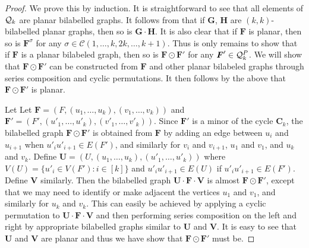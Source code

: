 \documentclass[11pt,a4paper]{article}
\theoremstyle{plain}
\theoremstyle{remark}
\theoremstyle{definition}
\newcommand{\cyclicpermutations}{\mathscr{C}(1,\dots, k, 2k, \dots, k+1)}
\begin{document}
\begin{proof}
    We prove this by induction. It is straightforward to see that all elements of ${\mathcal Q}_k$ are planar bilabelled graphs. It follows from \cite[Lemma 5.12]{david-laura} that if $\boldsymbol{G}$, $\boldsymbol{H}$ are $(k,k)$-bilabelled planar graphs, then so is $\boldsymbol{G} \cdot \boldsymbol{H}$. It is also clear that if $\boldsymbol{F}$ is planar, then so is $\boldsymbol{F}^\sigma$ for any $\sigma \in \cyclicpermutations$. Thus is only remains to show that if $\boldsymbol{F}$ is a planar bilabeled graph, then so is $\boldsymbol{F} \odot \boldsymbol{F}'$ for any $\boldsymbol{F}' \in {\mathcal Q}_k^P$. We will show that $\boldsymbol{F} \odot \boldsymbol{F}'$ can be constructed from $\boldsymbol{F}$ and other planar bilabeled graphs through series composition and cyclic permutations. It then follows by the above that $\boldsymbol{F} \odot \boldsymbol{F}'$ is planar.

    Let Let $\boldsymbol{F} = (F,(u_1,\ldots, u_k),(v_1,\ldots,v_k))$ and $\boldsymbol{F}' = (F',(u'_1,\ldots, u'_k),(v'_1,\ldots,v'_k))$. Since $\boldsymbol{F}'$ is a minor of the cycle $\boldsymbol{C}_k$, the bilabelled graph $\boldsymbol{F} \odot \boldsymbol{F}'$ is obtained from $\boldsymbol{F}$ by adding an edge between $u_i$ and $u_{i+1}$ when $u'_iu'_{i+1} \in E(F')$, and similarly for $v_{i}$ and $v_{i+1}$, $u_1$ and $v_1$, and $u_k$ and $v_k$. Define $\boldsymbol{U} = (U,(u_1,\ldots,u_k),(u'_1,\ldots,u'_k))$ where $V(U) = \{u'_i \in V(F') : i \in [k]\}$ and $u'_iu'_{i+1} \in E(U)$ if $u'_iu'_{i+1} \in E(F')$. Define $\boldsymbol{V}$ similarly. Then the bilabelled graph $\boldsymbol{U} \cdot \boldsymbol{F} \cdot \boldsymbol{V}$ is almost $\boldsymbol{F} \odot \boldsymbol{F}'$, except that we may need to identify or make adjacent the vertices $u_1$ and $v_1$, and similarly for $u_k$ and $v_k$. This can easily be achieved by applying a cyclic permutation to $\boldsymbol{U} \cdot \boldsymbol{F} \cdot \boldsymbol{V}$ and then performing series composition on the left and right by appropriate bilabelled graphs similar to $\boldsymbol{U}$ and $\boldsymbol{V}$. It is easy to see that $\boldsymbol{U}$ and $\boldsymbol{V}$ are planar and thus we have show that $\boldsymbol{F} \odot \boldsymbol{F}'$ must be.




\end{proof}

\iffalse
\begin{figure}
 \centering 
  \texttt{[image: enveloping\_cycle.pdf]}
  \label{fig:enveloping_cycle}
  \caption{Parallel composition preserves planarity.}\end{figure}
\fi
\end{document}
